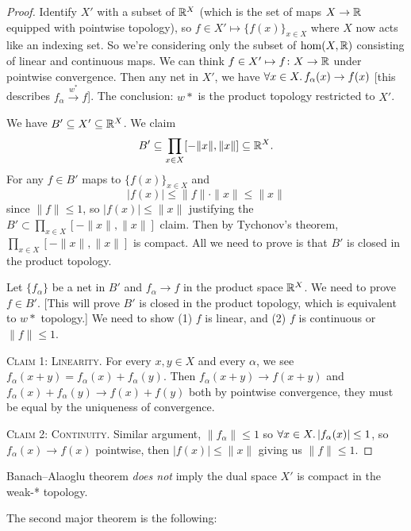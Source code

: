 \begin{proof}
Identify $X'$ with a subset of $\mathbb{R}^{X}$ (which is the set of maps
$X\to\mathbb{R}$ equipped with pointwise topology), so $f\in X'\mapsto\{f(x)\}_{x\in X}$
where $X$ now acts like an indexing set. So we're considering only the
subset of $\hom(X,\mathbb{R})$ consisting of linear and continuous maps. We
can think $f\in X'\mapsto f\colon X\to\mathbb{R}$ under pointwise
convergence. Then any net in $X'$, we have $\forall x\in X\ldotp f_{\alpha}(x)\to f(x)$
[this describes $f_{\alpha}\xrightarrow{w^{*}}f$]. The conclusion:
$w*$ is the product topology restricted to $X'$.

We have $B'\subseteq X'\subseteq\mathbb{R}^{X}$. We claim
\begin{equation}
B'\subseteq\prod_{x\in X}[-\|x\|,\|x\|]\subseteq\mathbb{R}^{X}.
\end{equation}
For any $f\in B'$ maps to $\{f(x)\}_{x\in X}$ and
\begin{equation}
|f(x)|\leq\|f\|\cdot\|x\|\leq\|x\|
\end{equation}
since $\|f\|\leq1$, so $|f(x)|\leq\|x\|$ justifying the
$B'\subset\prod_{x\in X}[-\|x\|,\|x\|]$ claim.
Then by Tychonov's theorem, $\prod_{x\in X}[-\|x\|,\|x\|]$ is
compact. All we need to prove is that $B'$ is closed in the product topology.

Let $\{f_{\alpha}\}$ be a net in $B'$ and $f_{\alpha}\to f$ in the
product space $\mathbb{R}^{X}$. We need to prove $f\in B'$. [This will prove
  $B'$ is closed in the product topology, which is equivalent to $w*$ topology.]
We need to show (1) $f$ is linear, and (2) $f$ is continuous or $\|f\|\leq1$.

\textsc{Claim 1: Linearity}. For every $x,y\in X$ and every $\alpha$,
we see $f_{\alpha}(x+y)=f_{\alpha}(x)+f_{\alpha}(y)$. Then
$f_{\alpha}(x+y)\to f(x+y)$ and $f_{\alpha}(x)+f_{\alpha}(y)\to f(x)+f(y)$ 
both by pointwise convergence, they must be equal by the uniqueness of
convergence.

\textsc{Claim 2: Continuity}. Similar argument, $\|f_{\alpha}\|\leq1$
so $\forall x\in X\ldotp|f_{\alpha}(x)|\leq1$, so $f_{\alpha}(x)\to f(x)$ pointwise,
then $|f(x)|\leq\|x\|$ giving us $\|f\|\leq1$.
\end{proof}

\begin{caution}
Banach--Alaoglu theorem \emph{does not} imply the dual space $X'$ is
compact in the weak-* topology.
\end{caution}

The second major theorem is the following:

